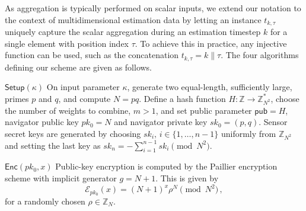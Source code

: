 \documentclass[10pt,letterpaper,oneside,twocolumn,journal]{IEEEtran}
\theoremstyle{definition}
\theoremstyle{definition}
\theoremstyle{remark}
\begin{document}
As aggregation is typically performed on scalar inputs, we extend our notation to the context of multidimensional estimation data by letting an instance $t_{k,\tau}$ uniquely capture the scalar aggregation during an estimation timestep $k$ for a single element with position index $\tau$. To achieve this in practice, any injective function can be used, such as the concatenation $t_{k,\tau}=k\mathbin\|\tau$. The four algorithms defining our scheme are given as follows.
\begin{LaTeXdescription}
    \item[$\mathsf{Setup}(\kappa)$] On input parameter $\kappa$, generate two equal-length, sufficiently large, primes $p$ and $q$, and compute $N=pq$. Define a hash function $H:\mathbb{Z} \rightarrow \mathbb{Z}_{N^2}^*$, choose the number of weights to combine, $m>1$, and set public parameter $\mathsf{pub}=H$, navigator public key $pk_0 = N$ and navigator private key $sk_0=(p,q)$. Sensor secret keys are generated by choosing $sk_i,\,i\in\{1,\dots,n-1\}$ uniformly from $\mathbb{Z}_{N^2}$ and setting the last key as $sk_n = -\sum^{n-1}_{i=1}sk_i \pmod{N^2}$.
 
    \item[$\mathsf{Enc}(pk_0, x)$] Public-key encryption is computed by the Paillier encryption scheme with implicit generator $g=N+1$. This is given by
    \begin{equation}
        \mathcal{E}_{pk_0}(x) = (N+1)^{x}\rho^N \pmod{N^2}\,, \label{eqn:our_scheme_encrypt}
    \end{equation}
    for a randomly chosen $\rho \in \mathbb{Z}_N$.


\end{LaTeXdescription}
\end{document}
